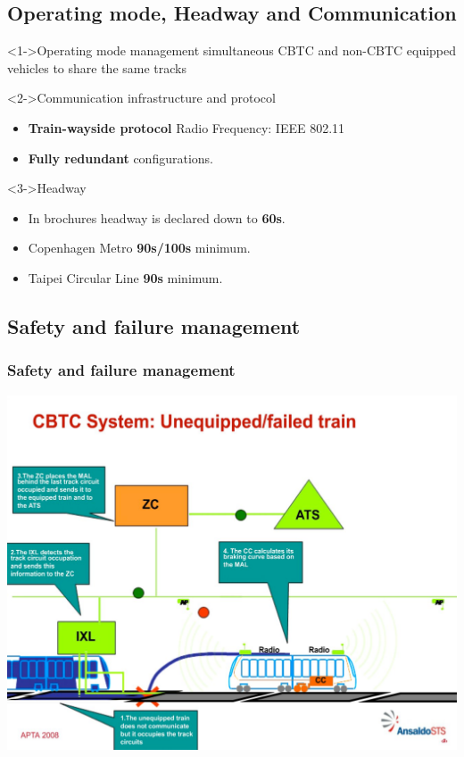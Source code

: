 \subsection{Operating mode, Headway and Communication}
\frame
{
\begin{block}<1->{Operating mode management}
simultaneous CBTC and non-CBTC equipped vehicles to share the same tracks
\end{block}

\begin{block}<2->{Communication infrastructure and protocol}
\begin{itemize}
\item  \textbf{Train-wayside protocol} Radio Frequency: IEEE 802.11 
\item  \textbf{Fully redundant} configurations.
\end{itemize}
\end{block}
\begin{block}<3->{Headway}
\begin{itemize}
\item In brochures headway is declared down to \textbf{60s}.
\item Copenhagen Metro  \textbf{90s/100s} minimum.
\item  Taipei Circular Line \textbf{90s} minimum.
\end{itemize}

   \end{block}

}


\subsection{Safety and failure management}
\frame
{
\frametitle{Safety and failure management}
 \begin{center}
	\includegraphics[scale=0.20]{./fig/AnsaldoUnequiped}
      \end{center} 


}

